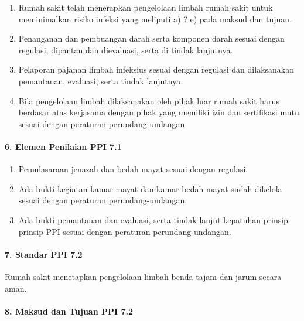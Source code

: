 \documentclass[
]{book}
\providecommand{\tightlist}{%
  \setlength{\itemsep}{0pt}\setlength{\parskip}{0pt}}
\begin{document}
\begin{enumerate}
\def\labelenumi{\alph{enumi}.}
\tightlist
\item
  Rumah sakit telah menerapkan pengelolaan limbah rumah sakit untuk meminimalkan risiko infeksi yang meliputi a) ? e) pada maksud dan tujuan.
\item
  Penanganan dan pembuangan darah serta komponen darah sesuai dengan regulasi, dipantau dan dievaluasi, serta di tindak lanjutnya.
\item
  Pelaporan pajanan limbah infeksius sesuai dengan regulasi dan dilaksanakan pemantauan, evaluasi, serta tindak lanjutnya.
\item
  Bila pengelolaan limbah dilaksanakan oleh pihak luar rumah sakit harus berdasar atas kerjasama dengan pihak yang memiliki izin dan sertifikasi mutu sesuai dengan peraturan perundang-undangan
\end{enumerate}

\hypertarget{elemen-penilaian-ppi-7.1}{%
\paragraph*{6. Elemen Penilaian PPI 7.1}\label{elemen-penilaian-ppi-7.1}}

\begin{enumerate}
\def\labelenumi{\alph{enumi}.}
\tightlist
\item
  Pemulasaraan jenazah dan bedah mayat sesuai dengan regulasi.
\item
  Ada bukti kegiatan kamar mayat dan kamar bedah mayat sudah dikelola sesuai dengan peraturan perundang-undangan.
\item
  Ada bukti pemantauan dan evaluasi, serta tindak lanjut kepatuhan prinsip-prinsip PPI sesuai dengan peraturan perundang-undangan.
\end{enumerate}

\hypertarget{standar-ppi-7.2-1}{%
\paragraph*{7. Standar PPI 7.2}\label{standar-ppi-7.2-1}}

Rumah sakit menetapkan pengelolaan limbah benda tajam dan jarum secara aman.

\hypertarget{maksud-dan-tujuan-ppi-7.2}{%
\paragraph*{8. Maksud dan Tujuan PPI 7.2}\label{maksud-dan-tujuan-ppi-7.2}}
\end{document}
